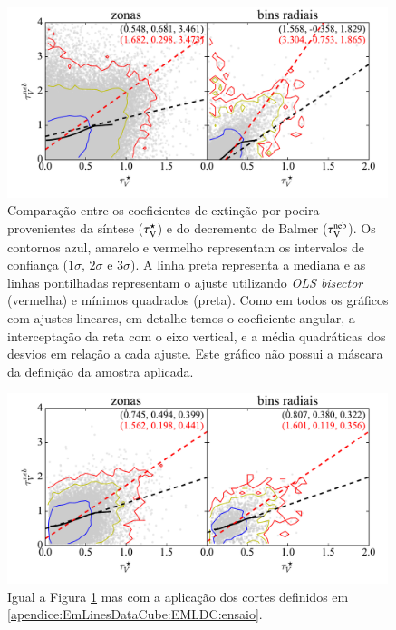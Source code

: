 \begin{figure}
	\centering
	\includegraphics[width=0.99\textwidth]{figuras/CompareTauV.pdf}
	\caption[Comparação entre os coeficientes de extinção]
	{Comparação entre os coeficientes de extinção por poeira provenientes da síntese ($\tau_{\mathrm{V}}^\star$) e do decremento de Balmer ($\tau_{\mathrm{V}}^{\mathrm{neb}}$). Os contornos azul, amarelo e vermelho representam os intervalos de confiança ($1\sigma$, $2\sigma$ e $3\sigma$). A linha preta representa a mediana e as linhas pontilhadas representam o ajuste utilizando {\em OLS bisector} (vermelha) e mínimos quadrados (preta). Como em todos os gráficos com ajustes lineares, em detalhe temos o coeficiente angular, a interceptação da reta com o eixo vertical, e a média quadráticas dos desvios em relação a cada ajuste. Este gráfico não possui a máscara da definição da amostra aplicada.}
	\label{fig:tauVsynvsneb}
\end{figure}

\begin{figure}
	\centering
	\includegraphics[width=0.99\textwidth]{figuras/CompareTauV_realsample.pdf}
	\caption[Comparação entre os coeficientes de extinção da amostra selecionada]
	{Igual a Figura \ref{fig:tauVsynvsneb} mas com a aplicação dos cortes definidos em \ref{apendice:EmLinesDataCube:EMLDC:ensaio}.}
	\label{fig:tauVsynvsnebMask}
\end{figure}

